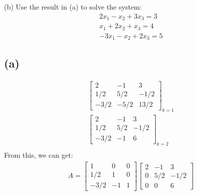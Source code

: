 \documentclass{article}
\begin{document}
\noindent 
(b) Use the result in (a) to solve the system:
\begin{align*}
    2x_1 - x_2 + 3x_3 = 3 \\
    x_1 + 2x_2 + x_3 = 4 \\
    -3x_1 - x_2 + 2x_3 = 5
\end{align*}

\subsection*{(a)}
\begin{align*}
    \begin{bmatrix}
        2 &-1 &3 \\
        1/2 & 5/2& -1/2 \\
        -3/2 &-5/2 &13/2 
    \end{bmatrix}_{k=1}   \\
    \begin{bmatrix}
        2 &-1 &3 \\
        1/2 & 5/2& -1/2 \\
        -3/2 &-1 &6 
    \end{bmatrix}_{k=2}  \\
\end{align*}
From this, we can get:
\begin{align*}
    A =  
    \begin{bmatrix}
        1 & 0  &0 \\
        1/2 & 1& 0 \\
        -3/2 &-1 &1 
    \end{bmatrix} 
    \begin{bmatrix}
        2 &-1 &3 \\
        0 & 5/2& -1/2 \\
        0 & 0 &6 
    \end{bmatrix} 
\end{align*}
\end{document}
